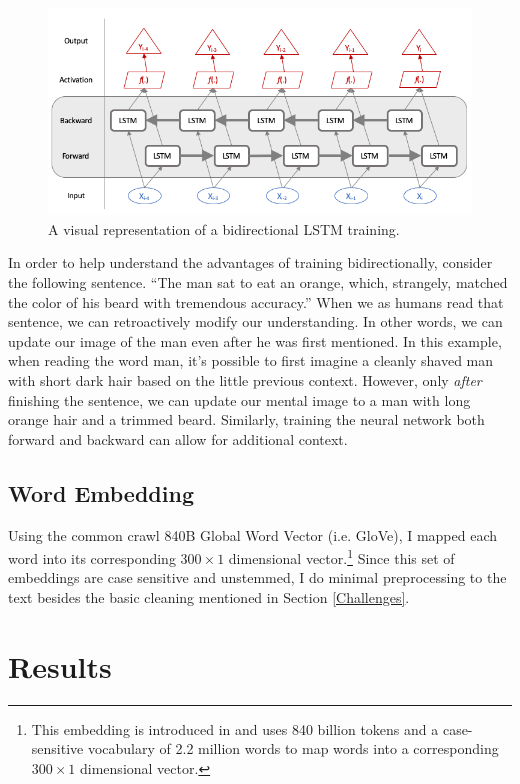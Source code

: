 \documentclass{article}
\begin{document}
	 \begin{figure}[H]
	 	\includegraphics[width=\textwidth]{figures/images/bidirectional-net.png}
	 	\caption{A visual representation of a bidirectional LSTM training.}
	 	\label{fig:bidirectional}
	 \end{figure}
	
	In order to help understand the advantages of training bidirectionally, consider the following sentence. ``The man sat to eat an orange, which, strangely, matched the color of his beard with tremendous accuracy.'' When we as humans read that sentence, we can retroactively modify our understanding. In other words, we can update our image of the man even after he was first mentioned. In this example, when reading the word man, it's possible to first imagine a cleanly shaved man with short dark hair based on the little previous context. However, only \textit{after} finishing the sentence, we can update our mental image to a man with long orange hair and a trimmed beard. Similarly, training the neural network both forward and backward can allow for additional context. 
	
	\subsection{Word Embedding}
	Using the common crawl 840B Global Word Vector (i.e. GloVe), I mapped each word into its corresponding $300 \times 1$ dimensional vector.\footnote{This embedding is introduced in \citet{pennington2014glove} and uses 840 billion tokens and a case-sensitive vocabulary of 2.2 million words to map words into a corresponding $300 \times 1$ dimensional vector.} Since this set of embeddings are case sensitive and unstemmed, I do minimal preprocessing to the text besides the basic cleaning mentioned in Section \ref{Challenges}.
		
	\section{Results}
	
\end{document}
